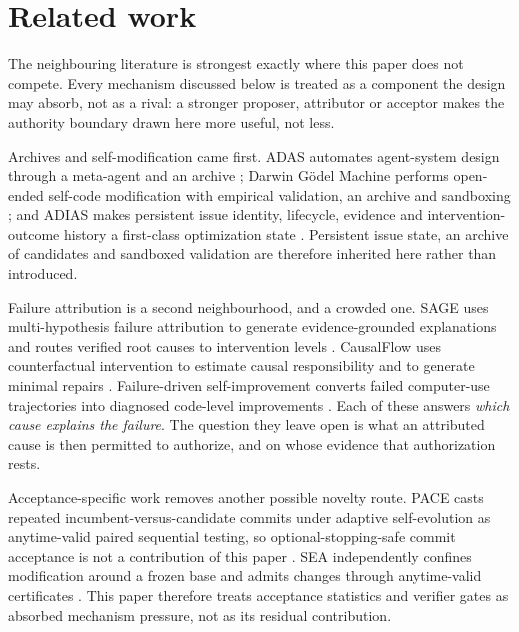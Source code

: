 \section{Related work}
\label{sec:related}

The neighbouring literature is strongest exactly where this paper does not compete. Every mechanism discussed below is treated as a component the design may absorb, not as a rival: a stronger proposer, attributor or acceptor makes the authority boundary drawn here more useful, not less.

Archives and self-modification came first. ADAS automates agent-system design through a meta-agent and an archive \cite{adas2024}; Darwin G\"odel Machine performs open-ended self-code modification with empirical validation, an archive and sandboxing \cite{dgm2025}; and ADIAS makes persistent issue identity, lifecycle, evidence and intervention-outcome history a first-class optimization state \cite{adias2026}. Persistent issue state, an archive of candidates and sandboxed validation are therefore inherited here rather than introduced.

Failure attribution is a second neighbourhood, and a crowded one. SAGE uses multi-hypothesis failure attribution to generate evidence-grounded explanations and routes verified root causes to intervention levels \cite{sagemhfa2026}. CausalFlow uses counterfactual intervention to estimate causal responsibility and to generate minimal repairs \cite{causalflow2026}. Failure-driven self-improvement converts failed computer-use trajectories into diagnosed code-level improvements \cite{failurelearning2026}. Each of these answers \emph{which cause explains the failure}. The question they leave open is what an attributed cause is then permitted to authorize, and on whose evidence that authorization rests.

Acceptance-specific work removes another possible novelty route. PACE casts repeated incumbent-versus-candidate commits under adaptive self-evolution as anytime-valid paired sequential testing, so optional-stopping-safe commit acceptance is not a contribution of this paper \cite{paceacceptance2026}. SEA independently confines modification around a frozen base and admits changes through anytime-valid certificates \cite{sea2026}. This paper therefore treats acceptance statistics and verifier gates as absorbed mechanism pressure, not as its residual contribution.

